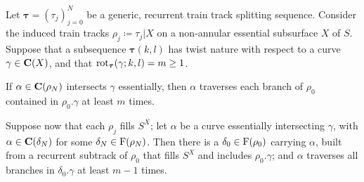 \begin{lemma}\label{lem:weightsaftertwist}
Let $\bm\tau=(\tau_j)_{j=0}^N$ be a generic, recurrent train track splitting sequence. Consider the induced train tracks $\rho_j\coloneqq \tau_j|X$ on a non-annular essential subsurface $X$ of $S$. Suppose that a subsequence $\bm\tau(k,l)$ has twist nature with respect to a curve $\gamma\in\mathbf C(X)$, and that $\mathrm{rot}_{\bm\tau}(\gamma;k,l)=m\geq 1$.

If $\alpha\in \mathbf C(\rho_N)$ intersects $\gamma$ essentially, then $\alpha$ traverses each branch of $\rho_0$ contained in $\rho_0.\gamma$ at least $m$ times.

Suppose now that each $\rho_j$ fills $S^X$; let $\alpha$ be a curve essentially intersecting $\gamma$, with $\alpha\in \mathbf C(\delta_N)$ for some $\delta_N\in \mathrm{F}(\rho_N)$. Then there is a $\delta_0\in \mathrm{F}(\rho_0)$ carrying $\alpha$, built from a recurrent subtrack of $\rho_0$ that fills $S^X$ and includes $\rho_0.\gamma$; and $\alpha$ traverses all branches in $\delta_0.\gamma$ at least $m-1$ times.
\end{lemma}
